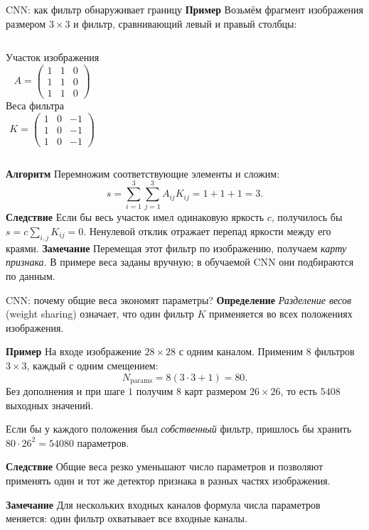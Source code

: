 \documentclass[10pt]{beamer}
\newcommand{\dblue}[1]{\textcolor{defblue}{#1}}
\newcommand{\mlBody}{\normalsize}
\newcommand{\mlDefinition}{\textcolor{defblue}{\bfseries Определение}}
\newcommand{\mlRemark}{\textcolor{defblue}{\bfseries Замечание}}
\newcommand{\mlConsequence}{\textcolor{defblue}{\bfseries Следствие}}
\newcommand{\mlExample}{\textcolor{defblue}{\bfseries Пример}}
\newcommand{\mlAlgorithm}{\textcolor{defblue}{\bfseries Алгоритм}}
\begin{document}
\begin{frame}{CNN: как фильтр обнаруживает границу}
\mlBody
\mlExample\; Возьмём фрагмент изображения размером $3\times3$ и фильтр, сравнивающий левый и правый столбцы:
\begin{columns}[T,onlytextwidth]
    \centering
    \dblue{Участок изображения}
    \[
    A=\begin{pmatrix}1&1&0\\1&1&0\\1&1&0\end{pmatrix}
    \]
    \centering
    \dblue{Веса фильтра}
    \[
    K=\begin{pmatrix}1&0&-1\\1&0&-1\\1&0&-1\end{pmatrix}
    \]
\end{columns}
\mlAlgorithm\; Перемножим соответствующие элементы и сложим:
\[
 s=\sum_{i=1}^{3}\sum_{j=1}^{3}A_{ij}K_{ij}=1+1+1=3.
\]
\mlConsequence\; Если бы весь участок имел одинаковую яркость $c$, получилось бы $s=c\sum_{i,j}K_{ij}=0$. Ненулевой отклик отражает перепад яркости между его краями.
\mlRemark\; Перемещая этот фильтр по изображению, получаем \emph{карту признака}. В примере веса заданы вручную; в обучаемой CNN они подбираются по данным.
\end{frame}


\begin{frame}{CNN: почему общие веса экономят параметры?}
\mlBody
\mlDefinition\; \textit{Разделение весов} (weight sharing) означает,
что один фильтр $K$ применяется во всех положениях изображения.

\mlExample\; На входе изображение $28\times28$ с одним каналом.
Применим $8$ фильтров $3\times3$, каждый с одним смещением:
\[
 \boxed{N_{\mathrm{params}}=8(3\cdot3+1)=80}.
\]
Без дополнения и при шаге $1$ получим
$8$ карт размером $26\times26$, то есть $5408$ выходных значений.

Если бы у каждого положения был \emph{собственный} фильтр, пришлось бы
хранить $80\cdot26^2=54080$ параметров.

\mlConsequence\; Общие веса резко уменьшают число параметров
и позволяют применять один и тот же детектор признака
в разных частях изображения.

\mlRemark\; Для нескольких входных каналов формула числа параметров
меняется: один фильтр охватывает все входные каналы.
\end{frame}
\end{document}
